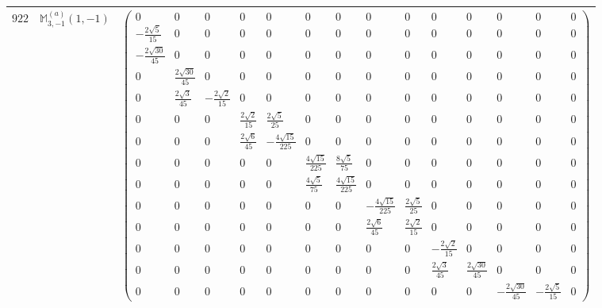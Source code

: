 \documentclass[fleqn,8pt,landscape]{jsarticle}
\begin{document}
\begin{center}
\begin{longtable}{ccc}
$ 922 $ & $ \mathbb{M}_{3,-1}^{(a)}(1,-1) $ & $ \begin{pmatrix} 0 & 0 & 0 & 0 & 0 & 0 & 0 & 0 & 0 & 0 & 0 & 0 & 0 & 0 \\ - \frac{2 \sqrt{5}}{15} & 0 & 0 & 0 & 0 & 0 & 0 & 0 & 0 & 0 & 0 & 0 & 0 & 0 \\ - \frac{2 \sqrt{30}}{45} & 0 & 0 & 0 & 0 & 0 & 0 & 0 & 0 & 0 & 0 & 0 & 0 & 0 \\ 0 & \frac{2 \sqrt{30}}{45} & 0 & 0 & 0 & 0 & 0 & 0 & 0 & 0 & 0 & 0 & 0 & 0 \\ 0 & \frac{2 \sqrt{3}}{45} & - \frac{2 \sqrt{2}}{15} & 0 & 0 & 0 & 0 & 0 & 0 & 0 & 0 & 0 & 0 & 0 \\ 0 & 0 & 0 & \frac{2 \sqrt{2}}{15} & \frac{2 \sqrt{5}}{25} & 0 & 0 & 0 & 0 & 0 & 0 & 0 & 0 & 0 \\ 0 & 0 & 0 & \frac{2 \sqrt{6}}{45} & - \frac{4 \sqrt{15}}{225} & 0 & 0 & 0 & 0 & 0 & 0 & 0 & 0 & 0 \\ 0 & 0 & 0 & 0 & 0 & \frac{4 \sqrt{15}}{225} & \frac{8 \sqrt{5}}{75} & 0 & 0 & 0 & 0 & 0 & 0 & 0 \\ 0 & 0 & 0 & 0 & 0 & \frac{4 \sqrt{5}}{75} & \frac{4 \sqrt{15}}{225} & 0 & 0 & 0 & 0 & 0 & 0 & 0 \\ 0 & 0 & 0 & 0 & 0 & 0 & 0 & - \frac{4 \sqrt{15}}{225} & \frac{2 \sqrt{5}}{25} & 0 & 0 & 0 & 0 & 0 \\ 0 & 0 & 0 & 0 & 0 & 0 & 0 & \frac{2 \sqrt{6}}{45} & \frac{2 \sqrt{2}}{15} & 0 & 0 & 0 & 0 & 0 \\ 0 & 0 & 0 & 0 & 0 & 0 & 0 & 0 & 0 & - \frac{2 \sqrt{2}}{15} & 0 & 0 & 0 & 0 \\ 0 & 0 & 0 & 0 & 0 & 0 & 0 & 0 & 0 & \frac{2 \sqrt{3}}{45} & \frac{2 \sqrt{30}}{45} & 0 & 0 & 0 \\ 0 & 0 & 0 & 0 & 0 & 0 & 0 & 0 & 0 & 0 & 0 & - \frac{2 \sqrt{30}}{45} & - \frac{2 \sqrt{5}}{15} & 0 \end{pmatrix} $ \\ \hline

\end{longtable}
\end{center}
\end{document}
